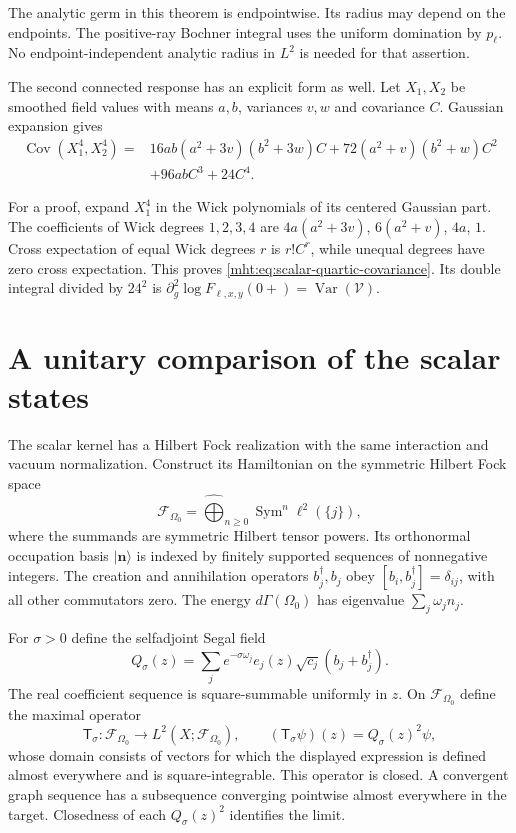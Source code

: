 The analytic germ in this theorem is endpointwise. Its radius may
depend on the endpoints. The positive-ray Bochner integral uses the
uniform domination by $p_\ell$. No endpoint-independent analytic
radius in $L^2$ is needed for that assertion.

The second connected response has an explicit form as well.
Let $X_1,X_2$ be smoothed field values with means $a,b$,
variances $v,w$ and covariance $C$. Gaussian expansion gives
\begin{equation}\label{mht:eq:scalar-quartic-covariance}
 \begin{split}
 \operatorname{Cov}(X_1^4,X_2^4)={}&
 16ab(a^2+3v)(b^2+3w)C
 +72(a^2+v)(b^2+w)C^2\\
 &+96abC^3+24C^4.
 \end{split}
\end{equation}

For a proof, expand $X_1^4$ in the Wick polynomials of its centered
Gaussian part. The coefficients of Wick degrees $1,2,3,4$ are
$4a(a^2+3v)$, $6(a^2+v)$, $4a$, $1$. Cross expectation of equal
Wick degrees $r$ is $r!C^r$, while unequal degrees have zero cross
expectation. This proves \eqref{mht:eq:scalar-quartic-covariance}.
Its double integral divided by $24^2$ is
$\partial_g^2\log F_{\ell,x,y}(0+)=\operatorname{Var}(\mathcal V)$.

\section{A unitary comparison of the scalar states}

The scalar kernel has a Hilbert Fock realization with the same
interaction and vacuum normalization. Construct its Hamiltonian
on the symmetric Hilbert Fock space
\[
 \mathcal F_{\Omega_0}
   =\widehat{\bigoplus}_{n\geq0}\operatorname{Sym}^n\ell^2(\{j\}),
\]
where the summands are symmetric Hilbert tensor powers.
Its orthonormal occupation basis $|\mathbf n\rangle$ is indexed by
finitely supported sequences of nonnegative integers.
The creation and annihilation operators $b_j^\dagger,b_j$ obey
$[b_i,b_j^\dagger]=\delta_{ij}$, with all other commutators zero.
The energy $d\Gamma(\Omega_0)$ has eigenvalue $\sum_j\omega_jn_j$.

For $\sigma>0$ define the selfadjoint Segal field
\[
 Q_\sigma(z)=\sum_j e^{-\sigma\omega_j}e_j(z)
                           \sqrt{c_j}(b_j+b_j^\dagger).
\]
The real coefficient sequence is square-summable uniformly in $z$.
On $\mathcal F_{\Omega_0}$ define the maximal operator
\[
 \mathsf T_\sigma:\mathcal F_{\Omega_0}\longrightarrow L^2(X;\mathcal F_{\Omega_0}),
 \qquad (\mathsf T_\sigma\psi)(z)=Q_\sigma(z)^2\psi,
\]
whose domain consists of vectors for which the displayed expression
is defined almost everywhere and is square-integrable.
This operator is closed. A convergent graph sequence has a
subsequence converging pointwise almost everywhere in the target.
Closedness of each $Q_\sigma(z)^2$ identifies the limit.

